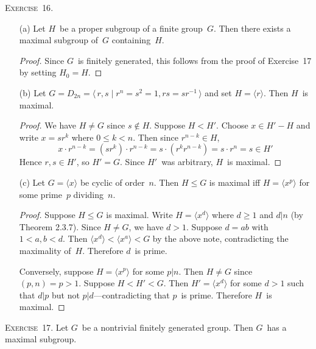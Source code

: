 \documentclass[letterpaper]{article}
\newcommand{\exercise}[1]{\goodbreak\noindent\textsc{Exercise~{#1}.}}
\newcommand{\subgroup}{\le}
\newcommand{\subgroupne}{<}
\renewcommand{\gcd}[2]{({#1},{#2})}
\newcommand{\gen}[1]{\langle{#1}\rangle}
\begin{document}
\exercise{16}
\begin{enumerate}[itemsep=0pt]
\item[(a)] Let $H$~be a proper subgroup of a finite group~$G$. Then there exists a maximal subgroup of~$G$ containing~$H$.
\begin{proof}
Since $G$~is finitely generated, this follows from the proof of Exercise~17 by setting $H_0=H$.
\end{proof}
\item[(b)] Let $G=D_{2n}=\gen{\,r,s\mid r^n=s^2=1, rs=sr^{-1}\,}$ and set $H=\gen{r}$. Then $H$~is maximal.
\begin{proof}
We have $H\ne G$ since $s\not\in H$. Suppose $H<H'$. Choose $x\in H'-H$ and write $x=sr^k$ where $0\le k<n$. Then since $r^{n-k}\in H$,
$$x\cdot r^{n-k}=(sr^k)\cdot r^{n-k}=s\cdot(r^k r^{n-k})=s\cdot r^n=s\in H'$$
Hence $r,s\in H'$, so $H'=G$. Since $H'$~was arbitrary, $H$~is maximal.
\end{proof}
\item[(c)] Let $G=\gen{x}$ be cyclic of order~$n$. Then $H\subgroup G$ is maximal iff $H=\gen{x^p}$ for some prime~$p$ dividing~$n$.
\begin{proof}
Suppose $H\subgroup G$ is maximal. Write $H=\gen{x^d}$ where $d\ge 1$ and $d|n$ (by Theorem 2.3.7). Since $H\ne G$, we have $d>1$. Suppose $d=ab$ with $1<a,b<d$. Then $\gen{x^d}\subgroupne\gen{x^a}\subgroupne G$ by the above note, contradicting the maximality of~$H$. Therefore $d$~is prime.

Conversely, suppose $H=\gen{x^p}$ for some $p|n$. Then $H\ne G$ since $\gcd{p}{n}=p>1$. Suppose $H<H'<G$. Then $H'=\gen{x^d}$ for some $d>1$ such that $d|p$ but not $p|d$---contradicting that $p$~is prime. Therefore $H$~is maximal.
\end{proof}
\end{enumerate}
\exercise{17}
Let $G$~be a nontrivial finitely generated group. Then $G$~has a maximal subgroup.
\end{document}
